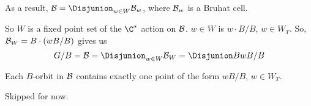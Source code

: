 \begin{cor}
  As a result, \(\cB = \Disjunion_{w \in W} \cB_w\), where \(\mathcal{B}_w\)
  is a Bruhat cell. 
\end{cor}
So \(W\) is a fixed point set of the \(\C^*\) action on \(\mathcal{B}\). \(w
\in W\) is \(w \cdot B/B\), \(w \in W_T\).  So, \(\mathcal{B}_W = B \cdot (wB/B)\) gives us \[
  G/B = \cB = \Disjunion_{w \in W} \cB_W = \Disjunion BwB/B
\]
\begin{cor}
  Each \(B\)-orbit in \(\mathcal{B}\) contains exactly one point of the form
  \(wB/B\), \(w \in W_T\). 
\end{cor}
\begin{prop}
Skipped for now.  
\end{prop}
